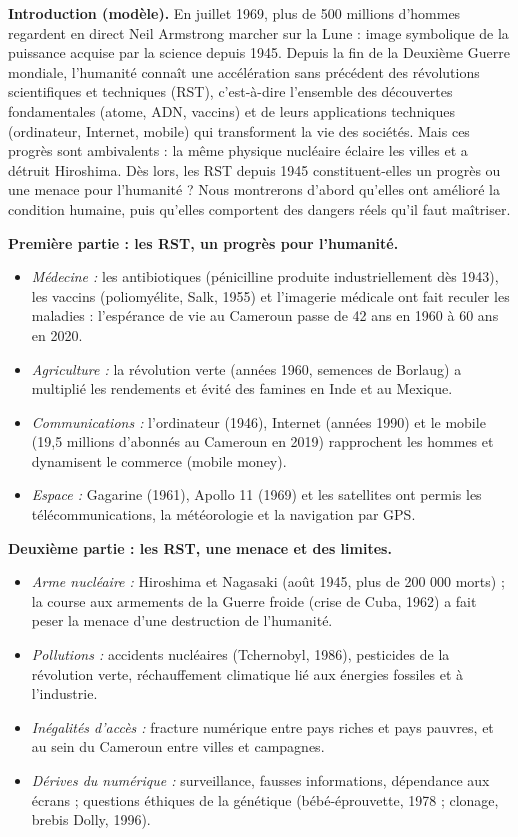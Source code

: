 \documentclass[11pt]{article}
\begin{document}
\begin{corrige}
\textbf{Introduction (modèle).} En juillet 1969, plus de 500 millions d'hommes regardent en direct Neil Armstrong marcher sur la Lune : image symbolique de la puissance acquise par la science depuis 1945. Depuis la fin de la Deuxième Guerre mondiale, l'humanité connaît une accélération sans précédent des révolutions scientifiques et techniques (RST), c'est-à-dire l'ensemble des découvertes fondamentales (atome, ADN, vaccins) et de leurs applications techniques (ordinateur, Internet, mobile) qui transforment la vie des sociétés. Mais ces progrès sont ambivalents : la même physique nucléaire éclaire les villes et a détruit Hiroshima. Dès lors, les RST depuis 1945 constituent-elles un progrès ou une menace pour l'humanité ? Nous montrerons d'abord qu'elles ont amélioré la condition humaine, puis qu'elles comportent des dangers réels qu'il faut maîtriser.

\textbf{Première partie : les RST, un progrès pour l'humanité.}
\begin{itemize}
\item \emph{Médecine :} les antibiotiques (pénicilline produite industriellement dès 1943), les vaccins (poliomyélite, Salk, 1955) et l'imagerie médicale ont fait reculer les maladies : l'espérance de vie au Cameroun passe de 42 ans en 1960 à 60 ans en 2020.
\item \emph{Agriculture :} la révolution verte (années 1960, semences de Borlaug) a multiplié les rendements et évité des famines en Inde et au Mexique.
\item \emph{Communications :} l'ordinateur (1946), Internet (années 1990) et le mobile (19,5 millions d'abonnés au Cameroun en 2019) rapprochent les hommes et dynamisent le commerce (mobile money).
\item \emph{Espace :} Gagarine (1961), Apollo 11 (1969) et les satellites ont permis les télécommunications, la météorologie et la navigation par GPS.
\end{itemize}

\textbf{Deuxième partie : les RST, une menace et des limites.}
\begin{itemize}
\item \emph{Arme nucléaire :} Hiroshima et Nagasaki (août 1945, plus de 200 000 morts) ; la course aux armements de la Guerre froide (crise de Cuba, 1962) a fait peser la menace d'une destruction de l'humanité.
\item \emph{Pollutions :} accidents nucléaires (Tchernobyl, 1986), pesticides de la révolution verte, réchauffement climatique lié aux énergies fossiles et à l'industrie.
\item \emph{Inégalités d'accès :} fracture numérique entre pays riches et pays pauvres, et au sein du Cameroun entre villes et campagnes.
\item \emph{Dérives du numérique :} surveillance, fausses informations, dépendance aux écrans ; questions éthiques de la génétique (bébé-éprouvette, 1978 ; clonage, brebis Dolly, 1996).
\end{itemize}


\end{corrige}
\end{document}
